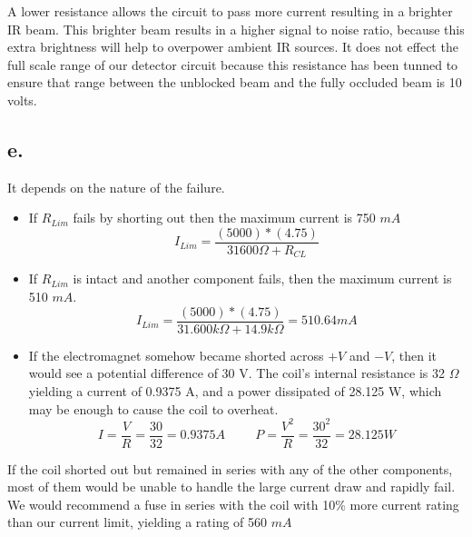 \documentclass{article}
\theoremstyle{plain}
\theoremstyle{definition}
\theoremstyle{remark}
\begin{document}
A lower resistance allows the circuit to pass more current resulting in a brighter IR beam. This brighter beam results in a higher signal to noise ratio, because this extra brightness will help to overpower ambient IR sources. It does not effect the full scale range of our detector circuit because this resistance has been tunned to ensure that range between the unblocked beam and the fully occluded beam is 10 volts.  \\  

\subsection*{e.}
It depends on the nature of the failure. 

\begin{itemize}
\item If $R_{Lim}$ fails by shorting out then the maximum current is 750 $mA$ \\

$$I_{Lim} = \frac{(5000)*(4.75)}{31600\Omega + R_{CL}} $$

\item If $R_{Lim}$ is intact and another component fails, then the maximum current is 510 $mA$. \\

$$I_{Lim} = \frac{(5000)*(4.75)}{31.600k\Omega + 14.9k\Omega} =510.64mA$$

\item If the electromagnet somehow became shorted across $+V$ and $-V$, then it would see a potential difference of 30 V.  The coil's internal resistance is 32 $\Omega$ yielding a current of 0.9375 A, and a power dissipated of 28.125 W, which may be enough to cause the coil to overheat.\\


$$I = \frac{V}{R} = \frac{30}{32} = 0.9375 A \hspace{1cm}  P = \frac{V^{2}}{R} = \frac{30^2}{32} = 28.125 W $$
\end{itemize}

If the coil shorted out but remained in series with any of the other components, most of them would be unable to handle the large current draw and rapidly fail.  We would recommend a fuse in series with the coil with 10\% more current rating than our current limit, yielding a rating of 560 $mA$\\
\end{document}
